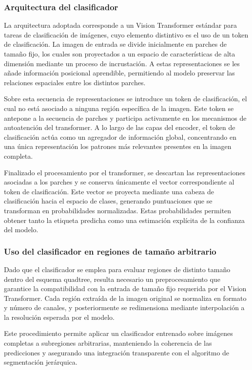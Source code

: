 \documentclass[onecolumn, 12pt , journal]{IEEEtran}
\begin{document}
\subsubsection{Arquitectura del clasificador}

La arquitectura adoptada corresponde a un Vision Transformer estándar para tareas de clasificación de imágenes, cuyo elemento distintivo es el uso de un token de clasificación. La imagen de entrada se divide inicialmente en parches de tamaño fijo, los cuales son proyectados a un espacio de características de alta dimensión mediante un proceso de incrustación. A estas representaciones se les añade información posicional aprendible, permitiendo al modelo preservar las relaciones espaciales entre los distintos parches.

Sobre esta secuencia de representaciones se introduce un token de clasificación, el cual no está asociado a ninguna región específica de la imagen. Este token se antepone a la secuencia de parches y participa activamente en los mecanismos de autoatención del transformer. A lo largo de las capas del encoder, el token de clasificación actúa como un agregador de información global, concentrando en una única representación los patrones más relevantes presentes en la imagen completa.

Finalizado el procesamiento por el transformer, se descartan las representaciones asociadas a los parches y se conserva únicamente el vector correspondiente al token de clasificación. Este vector se proyecta mediante una cabeza de clasificación hacia el espacio de clases, generando puntuaciones que se transforman en probabilidades normalizadas. Estas probabilidades permiten obtener tanto la etiqueta predicha como una estimación explícita de la confianza del modelo.

\subsubsection{Uso del clasificador en regiones de tamaño arbitrario}

Dado que el clasificador se emplea para evaluar regiones de distinto tamaño dentro del esquema quadtree, resulta necesario un preprocesamiento que garantice la compatibilidad con la entrada de tamaño fijo requerida por el Vision Transformer. Cada región extraída de la imagen original se normaliza en formato y número de canales, y posteriormente se redimensiona mediante interpolación a la resolución esperada por el modelo.

Este procedimiento permite aplicar un clasificador entrenado sobre imágenes completas a subregiones arbitrarias, manteniendo la coherencia de las predicciones y asegurando una integración transparente con el algoritmo de segmentación jerárquica.
\end{document}
